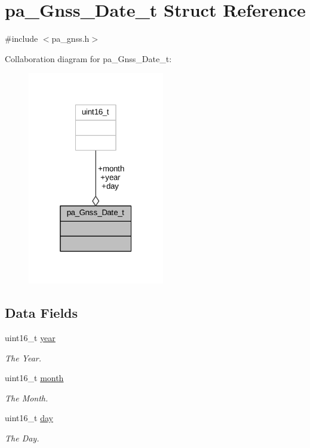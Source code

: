 \hypertarget{structpa___gnss___date__t}{}\section{pa\+\_\+\+Gnss\+\_\+\+Date\+\_\+t Struct Reference}
\label{structpa___gnss___date__t}


{\ttfamily \#include $<$pa\+\_\+gnss.\+h$>$}



Collaboration diagram for pa\+\_\+\+Gnss\+\_\+\+Date\+\_\+t\+:
\nopagebreak
\begin{figure}[H]
\begin{center}
\leavevmode
\includegraphics[width=169pt]{structpa___gnss___date__t__coll__graph}
\end{center}
\end{figure}
\subsection*{Data Fields}
\begin{DoxyCompactItemize}
\item 
uint16\+\_\+t \hyperlink{structpa___gnss___date__t_a2ac238d314385481e396a2acab852281}{year}
\begin{DoxyCompactList}\small\item\em The Year. \end{DoxyCompactList}\item 
uint16\+\_\+t \hyperlink{structpa___gnss___date__t_ae538279bffa94e12dc7d64b45f598093}{month}
\begin{DoxyCompactList}\small\item\em The Month. \end{DoxyCompactList}\item 
uint16\+\_\+t \hyperlink{structpa___gnss___date__t_a920fe496fac81fdd87202ac0ddd216b2}{day}
\begin{DoxyCompactList}\small\item\em The Day. \end{DoxyCompactList}\end{DoxyCompactItemize}


